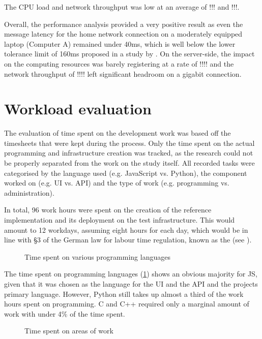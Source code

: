 The \ac{CPU} load and network throughput was low at an average of !!! and !!!.

Overall, the performance analysis provided a very positive result as even the message latency for the home network connection on a moderately equipped laptop (Computer A) remained under 40ms, which is well below the lower tolerance limit of 160ms proposed in a study by \cite{audioLatency}.
On the server-side, the impact on the computing resources was barely registering at a rate of !!!! and the network throughput of !!!! left significant headroom on a gigabit connection.

\section{Workload evaluation}

The evaluation of time spent on the development work was based off the timesheets that were kept during the process. Only the time spent on the actual programming and infrastructure creation was tracked, as the research could not be properly separated from the work on the study itself.
All recorded tasks were categorised by the language used (e.g. JavaScript vs. Python), the component worked on (e.g. \ac{UI} vs. \ac{API}) and the type of work (e.g. programming vs. administration).

In total, 96 work hours were spent on the creation of the reference implementation and its deployment on the test infrastructure. This would amount to 12 workdays, assuming eight hours for each day, which would be in line with §3 of the German law for labour time regulation, known as the  (see \parencite{abzgPar3}).

\begin{figure}[h]
\centering

\caption[Time spent on languages]{Time spent on various programming languages\protect}
\label{fig:timeSpentLanguages}
\end{figure}

The time spent on programming languages (\ref{fig:timeSpentLanguages}) shows an obvious majority for \ac{JS}, given that it was chosen as the language for the \ac{UI} and the \ac{API} and the project\textquotesingle s primary language.
However, Python still takes up almost a third of the work hours spent on programming.
C and C++ required only a marginal amount of work with under 4\% of the time spent.

\begin{figure}[h]
\centering

\caption[Time spent on areas of work]{Time spent on areas of work\protect}
\label{fig:timeSpentTypeOfWork}
\end{figure}

